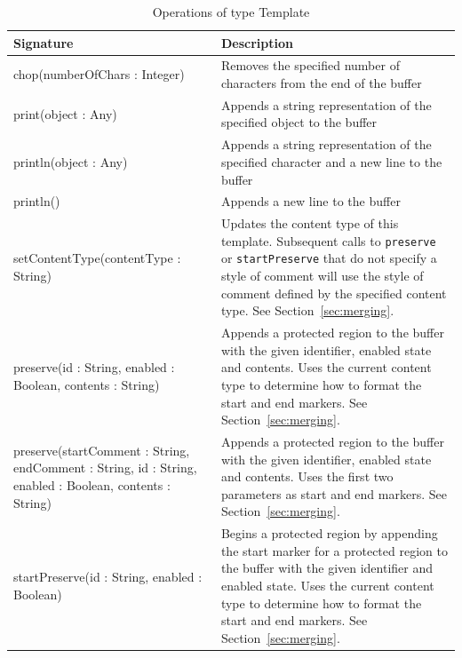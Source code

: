 \begin{longtabu} {|p{6.5cm}|X|}
			
			\caption{Operations of type Template}
			\label{tab:OutputBufferOperations}\\
			
			\hline
							
			\textbf{Signature} & \textbf{Description} \\\hline
			
			chop(numberOfChars : Integer) & Removes the specified number of characters from the end of the buffer \\\hline
			
			print(object : Any) & Appends a string representation of the specified object to the buffer \\\hline
			
			println(object : Any) & Appends a string representation of the specified character and a new line to the buffer \\\hline
			
			println() & Appends a new line to the buffer \\\hline
			
			setContentType(contentType : String) & Updates the content type of this template. Subsequent calls to \texttt{pr\-es\-er\-ve} or \texttt{st\-a\-rtPr\-es\-er\-ve} that do not specify a style of comment will use the style of comment defined by the specified content type. See Section~\ref{sec:merging}. \\\hline
			
			preserve(id : String, enabled : Boolean, contents : String) & Appends a protected region to the buffer with the given identifier, enabled state and contents. Uses the current content type to determine how to format the start and end markers. See Section~\ref{sec:merging}. \\\hline
			
			preserve(startComment : String, endComment : String, id : String, enabled : Boolean, contents : String) & Appends a protected region to the buffer with the given identifier, enabled state and contents. Uses the first two parameters as start and end markers. See Section~\ref{sec:merging}. \\\hline
			
			startPreserve(id : String, enabled : Boolean) & Begins a protected region by appending the start marker for a protected region to the buffer with the given identifier and enabled state. Uses the current content type to determine how to format the start and end markers. See Section~\ref{sec:merging}. \\\hline
			

\end{longtabu}
